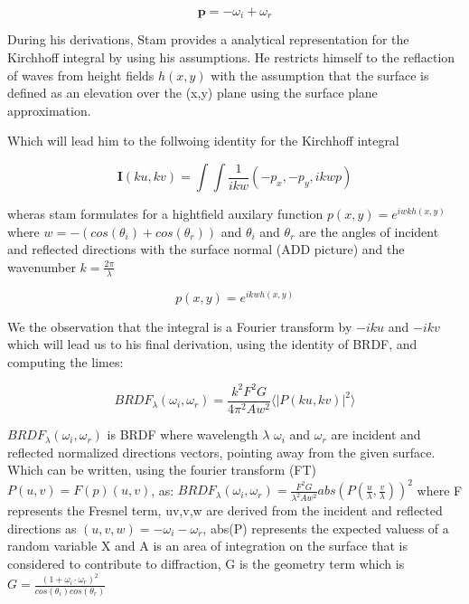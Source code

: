 \begin{equation*}
    \mathbf{p} = -\omega_i + \omega_r
\end{equation*}


During his derivations, Stam provides a analytical representation for the Kirchhoff integral by using his assumptions. He restricts himself to the reflaction of waves from height fields $h(x,y)$ with the assumption that the surface is defined as an elevation over the (x,y) plane using the surface plane approximation.

Which will lead him to the follwoing identity for the Kirchhoff integral

\begin{equation}
    \mathbf{I}(ku, kv) = \int \int \frac{1}{ikw}(-p_x, -p_y, ikwp) 
\end{equation}

wheras stam formulates for a hightfield auxilary function $p(x,y) = e^{iwkh(x,y)}$ where $w = -(cos(\theta_i)+cos(\theta_r))$ and $\theta_i$ and $\theta_r$ are the angles of incident and reflected directions with the surface normal (ADD picture) and the wavenumber $k=\frac{2\pi}{\lambda}$

\begin{equation}
    p(x,y) = e^{ikwh(x,y)}
\end{equation}

We the observation that the integral is a Fourier transform by $-iku$ and $-ikv$
which will lead us to his final derivation, using the identity of BRDF, and computing the limes:

\begin{equation} \label{eq:mainstam}
    BRDF_{\lambda}(\omega_i, \omega_r) = \frac{k^2 F^2 G}{4\pi^2 A w^2} \langle \left|P(ku, kv)\right|^2\rangle
\end{equation}

$BRDF_{\lambda}(\omega_i, \omega_r)$ is BRDF where wavelength $\lambda$ $\omega_i$ and $\omega_r$ are incident and reflected normalized directions vectors, pointing away from the given surface. Which can be written, using the fourier transform (FT) $P(u,v) = F(p)(u,v)$, as:
$BRDF_{\lambda}(\omega_i, \omega_r) = \frac{F^2 G}{\lambda^2 A w^2}abs(P(\frac{u}{\lambda},\frac{v}{\lambda}))^2$ where F represents the Fresnel term, uv,v,w are derived from the incident and reflected directions as $(u,v,w) = -\omega_i - \omega_r$, abs(P) represents the expected valuess of a random variable X and A is an area of integration on the surface that is considered to contribute to diffraction, G is the geometry term which is $G   =\frac{(1 + \omega_i \cdot \omega_r)^2}{cos(\theta_i)cos(\theta_r)}$


